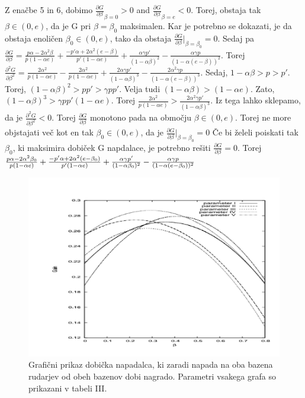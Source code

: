 \documentclass{acm_proc_article-sp}
\begin{document}
Z enačbe 5 in 6, dobimo $\frac{\partial G}{\partial \beta}_{\beta=0} > 0$ and $\frac{\partial G} {\partial \beta}_{\beta=e} < 0$. Torej, obstaja tak $\beta \in (0, e)$, da je G pri $\beta=\beta_0$ maksimalen. Kar je potrebno se dokazati, je da obstaja enoličen $\beta_0 \in (0,e)$, tako da obstaja $\frac{\partial G}{\partial \beta}|_{\beta=\beta_0} = 0$. Sedaj pa $\frac{\partial G}{\partial \beta} = \frac{p\alpha - 2\alpha^2 \beta}{p(1 - \alpha e)} + \frac{-p' \alpha + 2 \alpha^2(e - \beta)}{p' (1 - \alpha e)} + \frac{\alpha\gamma p'}{(1 - \alpha\beta)^2} - \frac{\alpha\gamma p}{(1 - \alpha(e- \beta))^2}$. Torej $\frac{\partial^2 G}{\partial \beta^2} = \frac{2\alpha^2}{p(1 - \alpha e)} - \frac{2 \alpha^2}{p(1 - \alpha e)} + \frac{2\alpha\gamma p'}{(1 - \alpha\beta)^3} - \frac{2\alpha^2 \gamma p}{(1 - \alpha(e - \beta))^3}$. Sedaj, $1 - \alpha\beta > p > p'$. Torej, $(1 - \alpha\beta)^2 > pp' > \gamma p p'$. Velja tudi $(1- \alpha\beta) > (1- \alpha e)$. Zato, $(1- \alpha\beta)^3 > \gamma p p'(1- \alpha e)$. Torej $\frac{2\alpha^2}{p(1 - \alpha e)} > \frac{2\alpha^2 \gamma p'}{(1 - \alpha\beta)^3}$. Iz tega lahko sklepamo, da je $\frac{\partial^2 G}{\partial \beta^2} < 0$. Torej $\frac{\partial G}{\partial \beta}$ monotono pada na območju $\beta \in (0, e)$. Torej ne more objstajati več kot en tak $\beta_0 \in (0, e)$, da je $\frac{\partial G}{\partial \beta}|_{\beta=\beta_0} = 0$
\newline
\newline
Če bi želeli poiskati tak $\beta_0$, ki maksimira dobiček G napdalace, je potrebno rešiti $\frac{\partial G}{\partial \beta} = 0$. Torej $\frac{p \alpha - 2\alpha^2 \beta_0}{p(1 - \alpha e)} + \\ \frac{-p'\alpha + 2\alpha^2(e - \beta_0)}{p'(1- \alpha e)} + \frac{\alpha\gamma p'}{(1 - \alpha\beta_0)^2} - \frac{\alpha\gamma p}{(1- \alpha(e - \beta_0))^2}$

\begin{figure}
  \includegraphics[scale=0.5]{image7_2.png}
  \caption{Grafični prikaz dobička napadalca, ki zaradi napada na oba bazena rudarjev od obeh bazenov dobi nagrado. Parametri vsakega grafa so prikazani v tabeli III.}
  \label{fig:boat1}
\end{figure}
\end{document}
